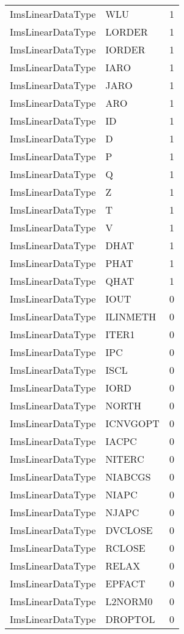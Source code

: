 \begin{longtable}{p{6cm} p{4cm} p{2cm} }
ImsLinearDataType &  WLU & 1 \\ 
ImsLinearDataType &  LORDER & 1 \\ 
ImsLinearDataType &  IORDER & 1 \\ 
ImsLinearDataType &  IARO & 1 \\ 
ImsLinearDataType &  JARO & 1 \\ 
ImsLinearDataType &  ARO & 1 \\ 
ImsLinearDataType &  ID & 1 \\ 
ImsLinearDataType &  D & 1 \\ 
ImsLinearDataType &  P & 1 \\ 
ImsLinearDataType &  Q & 1 \\ 
ImsLinearDataType &  Z & 1 \\ 
ImsLinearDataType &  T & 1 \\ 
ImsLinearDataType &  V & 1 \\ 
ImsLinearDataType &  DHAT & 1 \\ 
ImsLinearDataType &  PHAT & 1 \\ 
ImsLinearDataType &  QHAT & 1 \\ 
ImsLinearDataType &  IOUT & 0 \\ 
ImsLinearDataType &  ILINMETH & 0 \\ 
ImsLinearDataType &  ITER1 & 0 \\ 
ImsLinearDataType &  IPC & 0 \\ 
ImsLinearDataType &  ISCL & 0 \\ 
ImsLinearDataType &  IORD & 0 \\ 
ImsLinearDataType &  NORTH & 0 \\ 
ImsLinearDataType &  ICNVGOPT & 0 \\ 
ImsLinearDataType &  IACPC & 0 \\ 
ImsLinearDataType &  NITERC & 0 \\ 
ImsLinearDataType &  NIABCGS & 0 \\ 
ImsLinearDataType &  NIAPC & 0 \\ 
ImsLinearDataType &  NJAPC & 0 \\ 
ImsLinearDataType &  DVCLOSE & 0 \\ 
ImsLinearDataType &  RCLOSE & 0 \\ 
ImsLinearDataType &  RELAX & 0 \\ 
ImsLinearDataType &  EPFACT & 0 \\ 
ImsLinearDataType &  L2NORM0 & 0 \\ 
ImsLinearDataType &  DROPTOL & 0 \\ 

\end{longtable}
